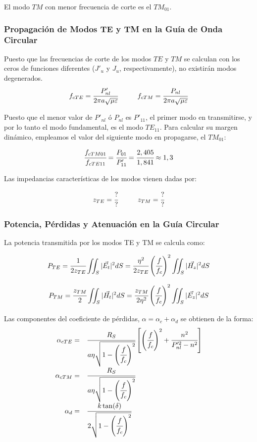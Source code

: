 \documentclass[12pt]{article}
\begin{document}
El modo $TM$ con menor frecuencia de corte es el $TM_{01}$.

\subsubsection{Propagaci\'on de Modos TE y TM en la Gu\'ia de Onda Circular}

Puesto que las frecuencias de corte de los modos $TE$ y $TM$ se calculan con los ceros de funciones diferentes ($J'_u$ y $J_u$, respectivamente), no existir\'an modos degenerados.
$$f_{cTE} = \cfrac{P'_{nl}}{2\pi a\sqrt{\mu\varepsilon}} \hspace{1cm} f_{cTM} = \cfrac{P_{nl}}{2\pi a\sqrt{\mu\varepsilon}}$$

Puesto que el menor valor de $P'_{nl}$ \'o $P_{nl}$ es $P'_{11}$, el primer modo en transmitirse, y por lo tanto el modo fundamental, es el modo $TE_{11}$. Para calcular su margen din\'amico, empleamos el valor del siguiente modo en propagarse, el $TM_{01}$:

$$\cfrac{f_{cTM01}}{f_{cTE11}} = \cfrac{P_{01}}{P'_{11}} = \cfrac{2,405}{1,841} \approx 1,3$$

Las impedancias caracter\'isticas de los modos vienen dadas por:

$$z_{TE} = \cfrac{?}{?} \hspace{1cm} z_{TM} = \cfrac{?}{?}$$

\subsubsection{Potencia, P\'erdidas y Atenuaci\'on en la Gu\'ia Circular}

La potencia transmitida por los modos TE y TM se calcula como:

$$P_{TE} =\cfrac{1}{2z_{TE}}\iint_S |\vec{E_t}|^2 dS = \cfrac{\eta^2}{2z_{TE}}\left(\cfrac{f}{f_c}\right)^2 \iint_S |\vec{H_z}|^2 dS$$

$$P_{TM} =\cfrac{z_{TM}}{2}\iint_S |\vec{H_t}|^2 dS = \cfrac{z_{TM}}{2\eta^2}\left(\cfrac{f}{f_c}\right)^2 \iint_S |\vec{E_z}|^2 dS$$

Las componentes del coeficiente de p\'erdidas, $\alpha = \alpha_c +\alpha_d$ se obtienen de la forma:
$$
\begin{array}{rl}
	\alpha_{cTE} = & \cfrac{R_S}{a\eta\sqrt{1-\left(\cfrac{f}{f_c}\right)^2}} \left[\left(\cfrac{f}{f_c}\right)^2 + \cfrac{n^2}{P'^2_{nl} -n^2}\right]\\
	\alpha_{cTM} = & \cfrac{R_S}{a\eta\sqrt{1-\left(\cfrac{f}{f_c}\right)^2}}\\
	\alpha_d = & \cfrac{k\tan(\delta)}{2\sqrt{1-\left(\cfrac{f}{f_c}\right)^2}}
\end{array}
$$
\end{document}
